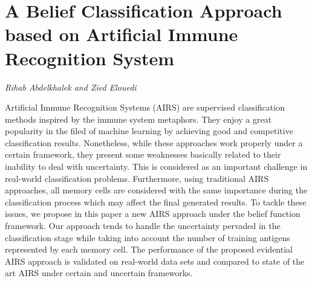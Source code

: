 \documentclass[../booklet.tex]{subfiles}
\begin{document}
\section[A Belief Classification Approach based on Artificial Immune Recognition System. {\it Rihab Abdelkhalek and Zied Elouedi}]{A Belief Classification Approach based on Artificial Immune Recognition System}
 

\begin{center}
  {\it Rihab Abdelkhalek and Zied Elouedi}
\end{center}

\vskip 0.8cm








Artificial Immune Recognition Systems (AIRS) are  supervised
classification methods inspired by the immune system metaphors. They enjoy a great popularity in the filed of machine learning by achieving good and competitive classification results. Nonetheless, while these approaches work properly under a certain framework, they
present some weaknesses basically related to their inability to deal with uncertainty. This is considered as an important challenge in real-world classification problems. Furthermore, using traditional AIRS approaches, all memory cells  are considered with the same importance during the classification process which may affect the final generated results. To tackle these issues, we propose in this paper a new AIRS approach under the belief function framework. Our approach tends to handle the uncertainty pervaded in the classification stage while taking into account the number of training antigens represented by each memory
cell. The performance of the proposed
evidential AIRS approach is validated on real-world data sets and compared to state of the art AIRS under certain and uncertain frameworks.



\end{document}

